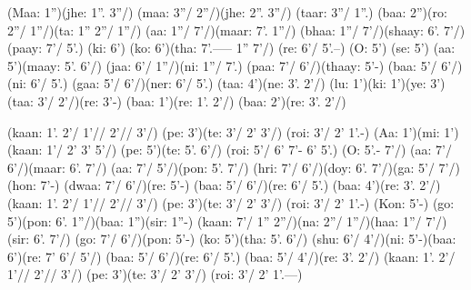 \documentclass[11pt]{article}
\begin{document}
\begin{jianpu}
(Maa: 1'')(jhe: 1''. 3''/) (maa: 3''/ 2''/)(jhe: 2''. 3''/) (taar: 3''/ 1''.) (baa: 2'')(ro: 2''/ 1''/)(ta: 1'' 2''/ 1''/)
(aa: 1''/ 7'/)(maar: 7'. 1''/) (bhaa: 1''/ 7'/)(shaay: 6'. 7'/) (paay: 7'/ 5'.) (ki: 6') (ko: 6')(tha: 7'.----- 1'' 7'/) (re: 6'/ 5'.--)
(O: 5') (se: 5') (aa: 5')(maay: 5'. 6'/) (jaa: 6'/ 1''/)(ni: 1''/ 7'.)
(paa: 7'/ 6'/)(thaay: 5'-) (baa: 5'/ 6'/)(ni: 6'/ 5'.) (gaa: 5'/ 6'/)(ner: 6'/ 5'.)
(taa: 4')(ne: 3'. 2'/) (lu: 1')(ki: 1')(ye: 3')
(taa: 3'/ 2'/)(re: 3'-) (baa: 1')(re: 1'. 2'/) (baa: 2')(re: 3'. 2'/)

(kaan: 1'. 2'/ 1'// 2'// 3'/) (pe: 3')(te: 3'/ 2' 3'/) (roi: 3'/ 2' 1'.-)
(Aa: 1')(mi: 1') (kaan: 1'/ 2' 3' 5'/) (pe: 5')(te: 5'. 6'/) (roi: 5'/ 6' 7'- 6' 5'.)
(O: 5'.- 7'/) (aa: 7'/ 6'/)(maar: 6'. 7'/) (aa: 7'/ 5'/)(pon: 5'. 7'/) (hri: 7'/ 6'/)(doy: 6'. 7'/)(ga: 5'/ 7'/)(hon: 7'-)
(dwaa: 7'/ 6'/)(re: 5'-) (baa: 5'/ 6'/)(re: 6'/ 5'.) (baa: 4')(re: 3'. 2'/) (kaan: 1'. 2'/ 1'// 2'// 3'/) (pe: 3')(te: 3'/ 2' 3'/) (roi: 3'/ 2' 1'.-)
(Kon: 5'-) (go: 5')(pon: 6'. 1''/)(baa: 1'')(sir: 1''-)
(kaan: 7'/ 1'' 2''/)(na: 2''/ 1''/)(haa: 1''/ 7'/)(sir: 6'. 7'/) (go: 7'/ 6'/)(pon: 5'-) (ko: 5')(tha: 5'. 6'/)
(shu: 6'/ 4'/)(ni: 5'-)(baa: 6')(re: 7' 6'/ 5'/) (baa: 5'/ 6'/)(re: 6'/ 5'.)
(baa: 5'/ 4'/)(re: 3'. 2'/) (kaan: 1'. 2'/ 1'// 2'// 3'/) (pe: 3')(te: 3'/ 2' 3'/) (roi: 3'/ 2' 1'.---)
\end{jianpu}
\end{document}
